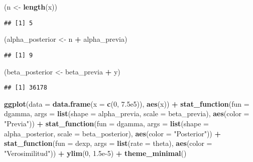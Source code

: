 \documentclass[
  12pt,
]{book}
\newenvironment{Shaded}{\begin{snugshade}}{\end{snugshade}}
\newcommand{\DataTypeTok}[1]{\textcolor[rgb]{0.13,0.29,0.53}{#1}}
\newcommand{\DecValTok}[1]{\textcolor[rgb]{0.00,0.00,0.81}{#1}}
\newcommand{\FloatTok}[1]{\textcolor[rgb]{0.00,0.00,0.81}{#1}}
\newcommand{\KeywordTok}[1]{\textcolor[rgb]{0.13,0.29,0.53}{\textbf{#1}}}
\newcommand{\NormalTok}[1]{#1}
\newcommand{\OperatorTok}[1]{\textcolor[rgb]{0.81,0.36,0.00}{\textbf{#1}}}
\newcommand{\StringTok}[1]{\textcolor[rgb]{0.31,0.60,0.02}{#1}}
\begin{document}
\begin{Shaded}
\begin{Highlighting}[]
\NormalTok{(n \textless{}{-}}\StringTok{ }\KeywordTok{length}\NormalTok{(x))}
\end{Highlighting}
\end{Shaded}

\begin{verbatim}
## [1] 5
\end{verbatim}

\begin{Shaded}
\begin{Highlighting}[]
\NormalTok{(alpha\_posterior \textless{}{-}}\StringTok{ }\NormalTok{n }\OperatorTok{+}\StringTok{ }\NormalTok{alpha\_previa)}
\end{Highlighting}
\end{Shaded}

\begin{verbatim}
## [1] 9
\end{verbatim}

\begin{Shaded}
\begin{Highlighting}[]
\NormalTok{(beta\_posterior \textless{}{-}}\StringTok{ }\NormalTok{beta\_previa }\OperatorTok{+}\StringTok{ }\NormalTok{y)}
\end{Highlighting}
\end{Shaded}

\begin{verbatim}
## [1] 36178
\end{verbatim}

\begin{Shaded}
\begin{Highlighting}[]
\KeywordTok{ggplot}\NormalTok{(}\DataTypeTok{data =} \KeywordTok{data.frame}\NormalTok{(}\DataTypeTok{x =} \KeywordTok{c}\NormalTok{(}\DecValTok{0}\NormalTok{, }\FloatTok{7.5e5}\NormalTok{)), }\KeywordTok{aes}\NormalTok{(x)) }\OperatorTok{+}
\StringTok{  }\KeywordTok{stat\_function}\NormalTok{(}\DataTypeTok{fun =}\NormalTok{ dgamma, }\DataTypeTok{args =} \KeywordTok{list}\NormalTok{(}\DataTypeTok{shape =}\NormalTok{ alpha\_previa, }\DataTypeTok{scale =}\NormalTok{ beta\_previa), }\KeywordTok{aes}\NormalTok{(}\DataTypeTok{color =} \StringTok{"Previa"}\NormalTok{)) }\OperatorTok{+}
\StringTok{  }\KeywordTok{stat\_function}\NormalTok{(}\DataTypeTok{fun =}\NormalTok{ dgamma, }\DataTypeTok{args =} \KeywordTok{list}\NormalTok{(}\DataTypeTok{shape =}\NormalTok{ alpha\_posterior, }\DataTypeTok{scale =}\NormalTok{ beta\_posterior), }\KeywordTok{aes}\NormalTok{(}\DataTypeTok{color =} \StringTok{"Posterior"}\NormalTok{)) }\OperatorTok{+}
\StringTok{  }\KeywordTok{stat\_function}\NormalTok{(}\DataTypeTok{fun =}\NormalTok{ dexp, }\DataTypeTok{args =} \KeywordTok{list}\NormalTok{(}\DataTypeTok{rate =}\NormalTok{ theta), }\KeywordTok{aes}\NormalTok{(}\DataTypeTok{color =} \StringTok{"Verosimilitud"}\NormalTok{)) }\OperatorTok{+}
\StringTok{  }\KeywordTok{ylim}\NormalTok{(}\DecValTok{0}\NormalTok{, }\FloatTok{1.5e{-}5}\NormalTok{) }\OperatorTok{+}
\StringTok{  }\KeywordTok{theme\_minimal}\NormalTok{()}
\end{Highlighting}
\end{Shaded}
\end{document}
